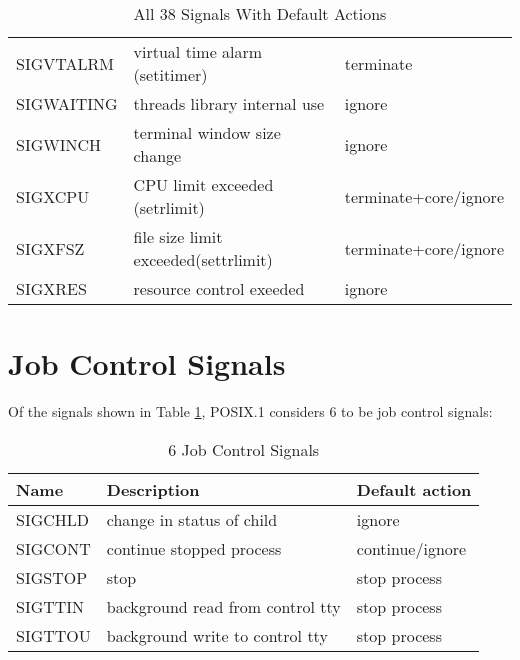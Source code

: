 \documentclass{article}
\begin{document}
\begin{table}[h!]
\begin{center}
\begin{tabular}[h!]{|l | l | l|}
        SIGVTALRM 	& virtual time alarm (setitimer)       & terminate             \\
        SIGWAITING 	& threads library internal use 	       & ignore                \\
        SIGWINCH 	& terminal window size change 		   & ignore                \\
        SIGXCPU 	& CPU limit exceeded (setrlimit)       & terminate+core/ignore \\
        SIGXFSZ 	& file size limit exceeded(settrlimit) & terminate+core/ignore \\
        SIGXRES 	& resource control exeeded             & ignore                \\
        \hline
\end{tabular}
    \caption{All 38 Signals With Default Actions}
    \label{allsignals}
\end{center}
\end{table}

\clearpage
\section{Job Control Signals}
Of the signals shown in Table \ref{allsignals}, POSIX.1 considers 6 to be job control signals:

\begin{table}[h!]
    \caption{6 Job Control Signals}
    \label{jcsignals}
\begin{center}
    \begin{tabular}[h!]{|l | l | l|}
        \hline
        Name        & Description 	                       & Default action        \\
        \hline
        SIGCHLD 	& change in status of child 	       & ignore                \\
        SIGCONT 	& continue stopped process 		       & continue/ignore       \\
        SIGSTOP 	& stop 		                           & stop process          \\
        SIGTTIN 	& background read from control tty 	   & stop process          \\
        SIGTTOU 	& background write to control tty 	   & stop process          \\
        \hline
\end{tabular}
\end{center}
\end{table}
\end{document}
